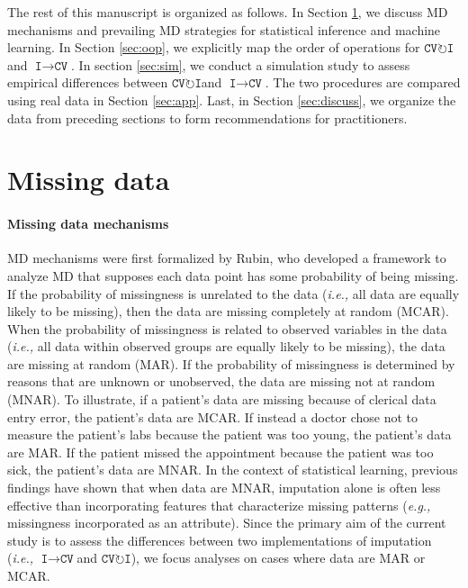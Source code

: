 \documentclass[AMA,STIX1COL,doublespace]{WileyNJD-v2}
\begin{document}
The rest of this manuscript is organized as follows. In Section
\ref{sec:missing_data}, we discuss MD mechanisms and prevailing MD
strategies for statistical inference and machine learning. In Section
\ref{sec:oop}, we explicitly map the order of operations for
$\texttt{CV}\!\circlearrowright\!\texttt{I}$\space and
$\texttt{I}\!\!\rightarrow\!\texttt{CV}$. In section \ref{sec:sim}, we
conduct a simulation study to assess empirical differences between
$\texttt{CV}\!\circlearrowright\!\texttt{I}$\space and
$\texttt{I}\!\!\rightarrow\!\texttt{CV}$. The two procedures are
compared using real data in Section \ref{sec:app}. Last, in Section
\ref{sec:discuss}, we organize the data from preceding sections to form
recommendations for practitioners.

\section{Missing data} \label{sec:missing_data}

\paragraph{Missing data mechanisms}

MD mechanisms were first formalized by Rubin,\citep{rubin1976inference}
who developed a framework to analyze MD that supposes each data point
has some probability of being missing. If the probability of missingness
is unrelated to the data (\textit{i.e., }all data are equally likely to
be missing), then the data are missing completely at random (MCAR). When
the probability of missingness is related to observed variables in the
data (\textit{i.e., }all data within observed groups are equally likely
to be missing), the data are missing at random (MAR). If the probability
of missingness is determined by reasons that are unknown or unobserved,
the data are missing not at random (MNAR). To illustrate, if a patient's
data are missing because of clerical data entry error, the patient's
data are MCAR. If instead a doctor chose not to measure the patient's
labs because the patient was too young, the patient's data are MAR. If
the patient missed the appointment because the patient was too sick, the
patient's data are MNAR. In the context of statistical learning,
previous findings have shown that when data are MNAR, imputation alone
is often less effective than incorporating features that characterize
missing patterns (\textit{e.g., }missingness incorporated as an
attribute).\citep{twala2008good, twala2009empirical, tang2017random}
Since the primary aim of the current study is to assess the differences
between two implementations of imputation
(\textit{i.e., }$\texttt{I}\!\!\rightarrow\!\texttt{CV}$\space and
$\texttt{CV}\!\circlearrowright\!\texttt{I}$), we focus analyses on
cases where data are MAR or MCAR.
\end{document}
